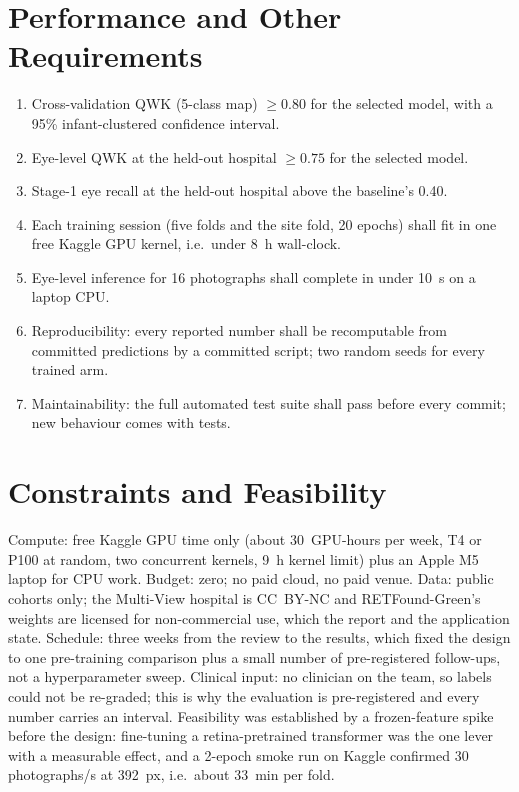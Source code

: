\section{Performance and Other Requirements}
\begin{enumerate}
\item[P1] Cross-validation QWK (5-class map) $\ge 0.80$ for the selected model, with a 95\% infant-clustered confidence interval.
\item[P2] Eye-level QWK at the held-out hospital $\ge 0.75$ for the selected model.
\item[P3] Stage-1 eye recall at the held-out hospital above the baseline's 0.40.
\item[P4] Each training session (five folds and the site fold, 20 epochs) shall fit in one free Kaggle GPU kernel, i.e.\ under 8~h wall-clock.
\item[P5] Eye-level inference for 16 photographs shall complete in under 10~s on a laptop CPU.
\item[P6] Reproducibility: every reported number shall be recomputable from committed predictions by a committed script; two random seeds for every trained arm.
\item[P7] Maintainability: the full automated test suite shall pass before every commit; new behaviour comes with tests.
\end{enumerate}

\section{Constraints and Feasibility}
Compute: free Kaggle GPU time only (about 30~GPU-hours per week, T4 or P100 at random, two concurrent kernels, 9~h kernel limit) plus an Apple M5 laptop for CPU work. Budget: zero; no paid cloud, no paid venue. Data: public cohorts only; the Multi-View hospital is CC~BY-NC and RETFound-Green's weights are licensed for non-commercial use, which the report and the application state. Schedule: three weeks from the review to the results, which fixed the design to one pre-training comparison plus a small number of pre-registered follow-ups, not a hyperparameter sweep. Clinical input: no clinician on the team, so labels could not be re-graded; this is why the evaluation is pre-registered and every number carries an interval. Feasibility was established by a frozen-feature spike before the design: fine-tuning a retina-pretrained transformer was the one lever with a measurable effect, and a 2-epoch smoke run on Kaggle confirmed 30 photographs/s at 392~px, i.e.\ about 33~min per fold.

